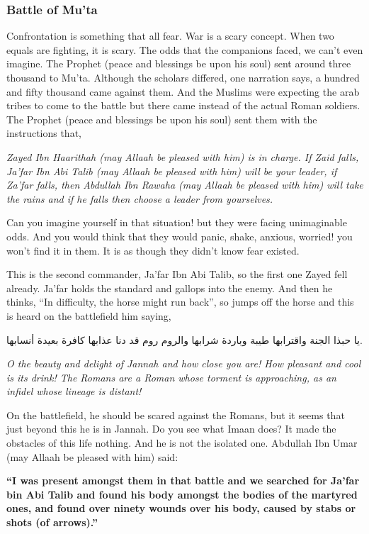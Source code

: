{\subsubsection*{Battle of Mu'ta}
Confrontation is something that all fear. War is a scary concept. When two equals are fighting, it is scary. The odds that the companions faced, we can't even imagine. The Prophet (peace and blessings be upon his soul) sent around three thousand to Mu'ta. Although the scholars differed, one narration says, a hundred and fifty thousand came against them. And the Muslims were expecting the arab tribes to come to the battle but there came instead of the actual Roman soldiers. The Prophet (peace and blessings be upon his soul) sent them with the instructions that, 
\begin{center}
    \textit{Zayed Ibn Haarithah (may Allaah be pleased with him) is in charge. If Zaid falls, Ja'far Ibn Abi Talib (may Allaah be pleased with him) will be your leader, if Za'far falls, then Abdullah Ibn Rawaha (may Allaah be pleased with him) will take the rains and if he falls then choose a leader from yourselves.}
\end{center}
Can you imagine yourself in that situation! but they were facing unimaginable odds. And you would think that they would panic, shake, anxious, worried! you won't find it in them. It is as though they didn't know fear existed.

This is the second commander, Ja'far Ibn Abi Talib, so the first one Zayed fell already. Ja'far holds the standard and gallops into the enemy. And then he thinks, ``In difficulty, the horse might run back'', so jumps off the horse and this is heard on the battlefield him saying,
\begin{center}
\begin{RLtext}
    يا حبذا الجنة واقترابها طيبة وباردة شرابها والروم روم قد دنا عذابها كافرة بعيدة أنسابها.
\end{RLtext} 
\textit{O the beauty and delight of Jannah and how close you are! How pleasant and cool is its drink! The Romans are a Roman whose torment is approaching, as an infidel whose lineage is distant!}
\end{center} 
On the battlefield, he should be scared against the Romans, but it seems that just beyond this he is in Jannah. Do you see what Imaan does? It made the obstacles of this life nothing. And he is not the isolated one. Abdullah Ibn Umar (may Allaah be pleased with him) said:
}
\textbf{
``I was present amongst them in that battle and we searched for Ja'far bin Abi Talib and found his body amongst the bodies of the martyred ones, and found over ninety wounds over his body, caused by stabs or shots (of arrows).''}
